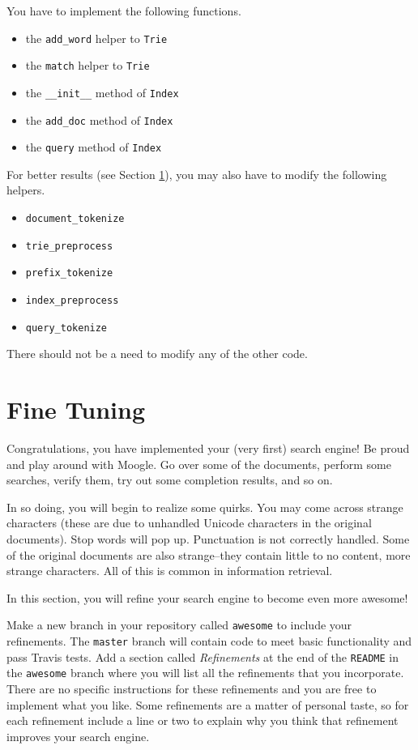 \documentclass[addpoints]{exam}
\begin{document}
You have to implement the following functions.
\begin{itemize}
\item the \texttt{add\_word} helper to \texttt{Trie}
\item the \texttt{match} helper to \texttt{Trie}
\item the \texttt{\_\_init\_\_} method of \texttt{Index}
\item the \texttt{add\_doc} method of \texttt{Index}
\item the \texttt{query} method of \texttt{Index}
\end{itemize}

\noindent For better results (see Section \ref{sec:refine}), you may also have to modify the following helpers.
\begin{itemize}
\item \texttt{document\_tokenize}
\item \texttt{trie\_preprocess}
\item \texttt{prefix\_tokenize}
\item \texttt{index\_preprocess}
\item \texttt{query\_tokenize}
\end{itemize}

There should not be a need to modify any of the other code.

\section{Fine Tuning}
\label{sec:refine}

Congratulations, you have implemented your (very first) search engine! Be proud and play around with Moogle. Go over some of the documents, perform some searches, verify them, try out some completion results, and so on.

In so doing, you will begin to realize some quirks. You may come across strange characters (these are due to unhandled Unicode characters in the original documents). Stop words will pop up. Punctuation is not correctly handled. Some of the original documents are also strange--they contain little to no content, more strange characters. All of this is common in information retrieval.

In this section, you will refine your search engine to become even more awesome!

Make a new branch in your repository called \texttt{awesome} to include your refinements. The \texttt{master} branch will contain code to meet basic functionality and pass Travis tests. Add a section called \textit{Refinements} at the end of the \texttt{README} in the \texttt{awesome} branch where you will list all the refinements that you incorporate. There are no specific instructions for these refinements and you are free to implement what you like. Some refinements are a matter of personal taste, so for each refinement include a line or two to explain why you think that refinement improves your search engine.
\end{document}
